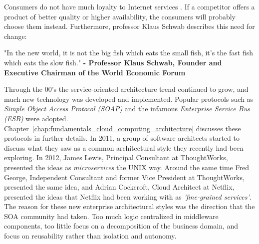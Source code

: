 \noindent
Consumers do not have much loyalty to Internet services \cite{iscoop-eu}. If a competitor offers a product of better quality or higher availability, the consumers will probably choose them instead. Furthermore, professor Klaus Schwab describes this need for change:

\begin{citat} []
"In the new world, it is not the big fish which eats the small fish, it’s the fast fish which eats the slow fish." \textbf{- Professor Klaus Schwab, Founder and Executive Chairman of the World Economic Forum} \cite{schwab2015techrevolusion}
\end{citat}


\noindent Through the 00's the service-oriented architecture trend continued to grow, and much new technology was developed and implemented. Popular protocols such as \textit{Simple Object Access Protocol (SOAP)} and the infamous \textit{Enterprise Service Bus (ESB)} were adopted. Chapter~\ref{chap:fundamentals_cloud_computing_architecture} discusses these protocols in further details. In 2011, a group of software architects started to discuss what they saw as a common architectural style they recently had been exploring. In 2012, James Lewis, Principal Consultant at ThoughtWorks, presented the ideas as \textit{microservices} the UNIX way. Around the same time Fred George, Independent Consultant and former Vice President at ThoughtWorks, presented the same idea, and Adrian Cockcroft, Cloud Architect at Netflix, presented the ideas that Netflix had been working with as \textit{'fine-grained services'}. \\

\noindent
The reason for these new enterprise architectural styles was the direction that the SOA community had taken. Too much logic centralized in middleware components, too little focus on a decomposition of the business domain, and focus on reusability rather than isolation and autonomy. \\


